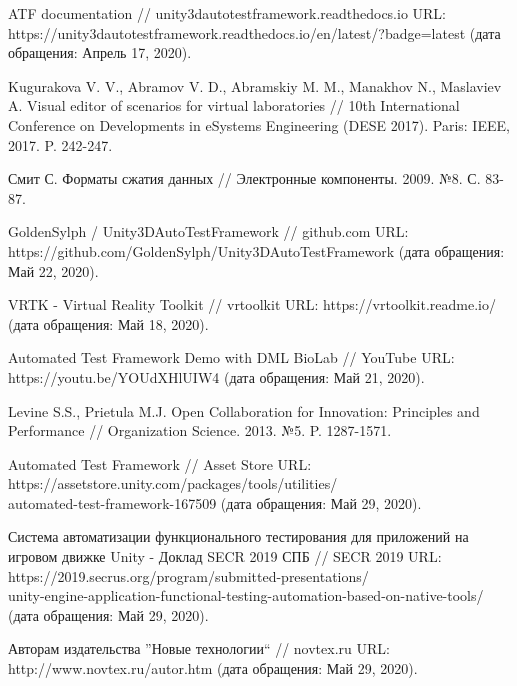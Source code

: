 \begin{thebibliography}{9}
	 ATF documentation // unity3dautotestframework.readthedocs.io URL: https://unity3dautotestframework.readthedocs.io/en/latest/?badge=latest (дата обращения: Апрель 17, 2020).
	
	 Kugurakova V. V., Abramov V. D., Abramskiy M. M., Manakhov N., Maslaviev A. Visual editor of scenarios for virtual laboratories // 10th International Conference on Developments in eSystems Engineering (DESE 2017). Paris: IEEE, 2017. P. 242-247.
	
	 Смит С. Форматы сжатия данных // Электронные компоненты. 2009. №8. С. 83-87.
	
	 GoldenSylph / Unity3DAutoTestFramework // github.com URL: https://github.com/GoldenSylph/Unity3DAutoTestFramework (дата обращения: Май 22, 2020).
	
	 VRTK - Virtual Reality Toolkit // vrtoolkit URL: https://vrtoolkit.readme.io/ (дата обращения: Май 18, 2020).
	
	 Automated Test Framework Demo with DML BioLab // YouTube URL: https://youtu.be/YOUdXHlUIW4 (дата обращения: Май 21, 2020).
	
	 Levine S.S., Prietula M.J. Open Collaboration for Innovation: Principles and Performance // Organization Science. 2013. №5. P. 1287-1571.

	 Automated Test Framework // Asset Store URL: https://assetstore.unity.com/packages/tools/utilities/\\automated-test-framework-167509 (дата обращения: Май 29, 2020).
	
	 Система автоматизации функционального тестирования для приложений на игровом движке Unity - Доклад SECR 2019 СПБ // SECR 2019 URL: https://2019.secrus.org/program/submitted-presentations/\\unity-engine-application-functional-testing-automation-based-on-native-tools/ (дата обращения: Май 29, 2020).
	
	 Авторам издательства ''Новые технологии`` // novtex.ru URL: http://www.novtex.ru/autor.htm (дата обращения: Май 29, 2020).
	
\end{thebibliography}